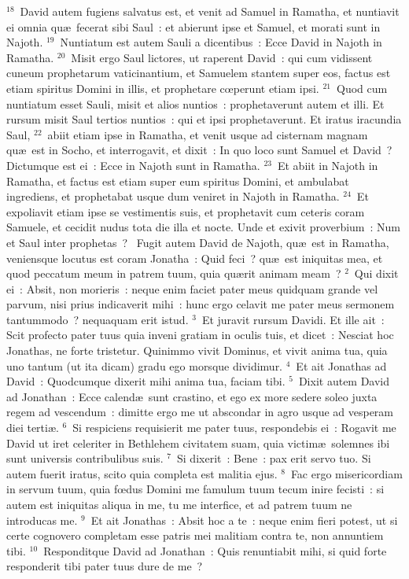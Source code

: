 ${}^{18}$~David autem fugiens salvatus est, et venit ad Samuel in Ramatha, et nuntiavit ei omnia qu\ae\ fecerat sibi Saul~: et abierunt ipse et Samuel, et morati sunt in Najoth.
${}^{19}$~Nuntiatum est autem Sauli a dicentibus~: Ecce David in Najoth in Ramatha.
${}^{20}$~Misit ergo Saul lictores, ut raperent David~: qui cum vidissent cuneum prophetarum vaticinantium, et Samuelem stantem super eos, factus est etiam spiritus Domini in illis, et prophetare cœperunt etiam ipsi.
${}^{21}$~Quod cum nuntiatum esset Sauli, misit et alios nuntios~: prophetaverunt autem et illi. Et rursum misit Saul tertios nuntios~: qui et ipsi prophetaverunt. Et iratus iracundia Saul,
${}^{22}$~abiit etiam ipse in Ramatha, et venit usque ad cisternam magnam qu\ae\ est in Socho, et interrogavit, et dixit~: In quo loco sunt Samuel et David~? Dictumque est ei~: Ecce in Najoth sunt in Ramatha.
${}^{23}$~Et abiit in Najoth in Ramatha, et factus est etiam super eum spiritus Domini, et ambulabat ingrediens, et prophetabat usque dum veniret in Najoth in Ramatha.
${}^{24}$~Et expoliavit etiam ipse se vestimentis suis, et prophetavit cum ceteris coram Samuele, et cecidit nudus tota die illa et nocte. Unde et exivit proverbium~: Num et Saul inter prophetas~?
~Fugit autem David de Najoth, qu\ae\ est in Ramatha, veniensque locutus est coram Jonatha~: Quid feci~? qu\ae\ est iniquitas mea, et quod peccatum meum in patrem tuum, quia qu\ae rit animam meam~?
${}^{2}$~Qui dixit ei~: Absit, non morieris~: neque enim faciet pater meus quidquam grande vel parvum, nisi prius indicaverit mihi~: hunc ergo celavit me pater meus sermonem tantummodo~? nequaquam erit istud.
${}^{3}$~Et juravit rursum Davidi. Et ille ait~: Scit profecto pater tuus quia inveni gratiam in oculis tuis, et dicet~: Nesciat hoc Jonathas, ne forte tristetur. Quinimmo vivit Dominus, et vivit anima tua, quia uno tantum (ut ita dicam) gradu ego morsque dividimur.
${}^{4}$~Et ait Jonathas ad David~: Quodcumque dixerit mihi anima tua, faciam tibi.
${}^{5}$~Dixit autem David ad Jonathan~: Ecce calend\ae\ sunt crastino, et ego ex more sedere soleo juxta regem ad vescendum~: dimitte ergo me ut abscondar in agro usque ad vesperam diei terti\ae .
${}^{6}$~Si respiciens requisierit me pater tuus, respondebis ei~: Rogavit me David ut iret celeriter in Bethlehem civitatem suam, quia victim\ae\ solemnes ibi sunt universis contribulibus suis.
${}^{7}$~Si dixerit~: Bene~: pax erit servo tuo. Si autem fuerit iratus, scito quia completa est malitia ejus.
${}^{8}$~Fac ergo misericordiam in servum tuum, quia fœdus Domini me famulum tuum tecum inire fecisti~: si autem est iniquitas aliqua in me, tu me interfice, et ad patrem tuum ne introducas me.
${}^{9}$~Et ait Jonathas~: Absit hoc a te~: neque enim fieri potest, ut si certe cognovero completam esse patris mei malitiam contra te, non annuntiem tibi.
${}^{10}$~Responditque David ad Jonathan~: Quis renuntiabit mihi, si quid forte responderit tibi pater tuus dure de me~?


